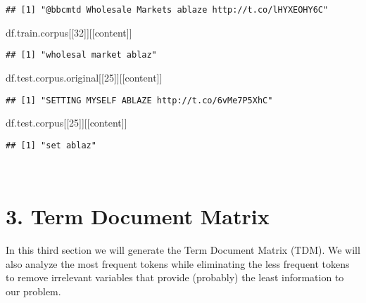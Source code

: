 \documentclass[
]{article}
\newenvironment{Shaded}{\begin{snugshade}}{\end{snugshade}}
\newcommand{\NormalTok}[1]{#1}
\newcommand{\StringTok}[1]{\textcolor[rgb]{0.31,0.60,0.02}{#1}}
\begin{document}
\begin{verbatim}
## [1] "@bbcmtd Wholesale Markets ablaze http://t.co/lHYXEOHY6C"
\end{verbatim}

\begin{Shaded}
\begin{Highlighting}[]
\NormalTok{df.train.corpus[[}\StringTok{\textquotesingle{}32\textquotesingle{}}\NormalTok{]][[}\StringTok{\textquotesingle{}content\textquotesingle{}}\NormalTok{]]}
\end{Highlighting}
\end{Shaded}

\begin{verbatim}
## [1] "wholesal market ablaz"
\end{verbatim}

\begin{Shaded}
\begin{Highlighting}[]
\NormalTok{df.test.corpus.original[[}\StringTok{\textquotesingle{}25\textquotesingle{}}\NormalTok{]][[}\StringTok{\textquotesingle{}content\textquotesingle{}}\NormalTok{]]}
\end{Highlighting}
\end{Shaded}

\begin{verbatim}
## [1] "SETTING MYSELF ABLAZE http://t.co/6vMe7P5XhC"
\end{verbatim}

\begin{Shaded}
\begin{Highlighting}[]
\NormalTok{df.test.corpus[[}\StringTok{\textquotesingle{}25\textquotesingle{}}\NormalTok{]][[}\StringTok{\textquotesingle{}content\textquotesingle{}}\NormalTok{]]}
\end{Highlighting}
\end{Shaded}

\begin{verbatim}
## [1] "set ablaz"
\end{verbatim}

~

\hypertarget{term-document-matrix}{%
\section{3. Term Document Matrix}\label{term-document-matrix}}

In this third section we will generate the Term Document Matrix (TDM).
We will also analyze the most frequent tokens while eliminating the less
frequent tokens to remove irrelevant variables that provide (probably)
the least information to our problem.
\end{document}

